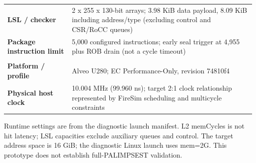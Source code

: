 \begin{table}[t]
\begin{tabularx}{\columnwidth}{@{}>{\bfseries}p{}X@{}}
LSL / checker & 2 x 255 x 130-bit arrays; 3.98 KiB data payload, 8.09 KiB including address/type (excluding control and CSR/RoCC queues) \\
Package instruction limit & 5,000 configured instructions; early seal trigger at 4,955 plus ROB drain (not a cycle timeout) \\
\hline
\multicolumn{2}{c}{\textbf{FPGA Implementation}} \\ \hline
Platform / profile & Alveo U280; EC Performance-Only, revision 74810f4 \\
Physical host clock & 10.004 MHz (99.960 ns); target 2:1 clock relationship represented by FireSim scheduling and multicycle constraints \\
\hline
\end{tabularx}
\vspace{2pt}
\parbox{\columnwidth}{\scriptsize Runtime settings are from the diagnostic launch manifest. L2 memCycles is not hit latency; LSL capacities exclude auxiliary queues and control. The target address space is 16 GiB; the diagnostic Linux launch uses mem=2G. This prototype does not establish full-PALIMPSEST validation.}
\end{table}
